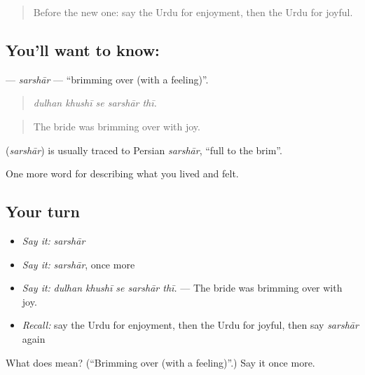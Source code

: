 \label{lesson:UR-C441-sarshar}



\begin{quote}
Before the new one: say the Urdu for enjoyment, then the Urdu for joyful.
\end{quote}

\subsection*{You'll want to know: }
\textbf{} — \emph{sarshār} — \textquotedblleft{}brimming over (with a feeling)\textquotedblright{}.

\begin{quote}
    
\end{quote}

\begin{quote}
\emph{dulhan khushī se sarshār thī.}
\end{quote}

\begin{quote}
The bride was brimming over with joy.
\end{quote}

\begin{cousinweb}
\textbf{} (\emph{sarshār}) is usually traced to Persian \emph{sarshār}, \textquotedblleft{}full to the brim\textquotedblright{}.
\end{cousinweb}

\begin{grammarlens}[title={What you've built}]
One more word for describing what you lived and felt.
\end{grammarlens}

\subsection*{Your turn}
\begin{itemize}
\raggedright
  \item \emph{Say it:} \emph{sarshār}
  \item \emph{Say it:} \emph{sarshār}, once more
  \item \emph{Say it:} \emph{dulhan khushī se sarshār thī.} — The bride was brimming over with joy.
  \item \emph{Recall:} say the Urdu for enjoyment, then the Urdu for joyful, then say \emph{sarshār} again
\end{itemize}

\begin{tcolorbox}[breakable,colback=teal!4,colframe=teal!35!black,title={Before you move on}]
What does  mean? (\textquotedblleft{}Brimming over (with a feeling)\textquotedblright{}.) Say it once more.
\end{tcolorbox}
